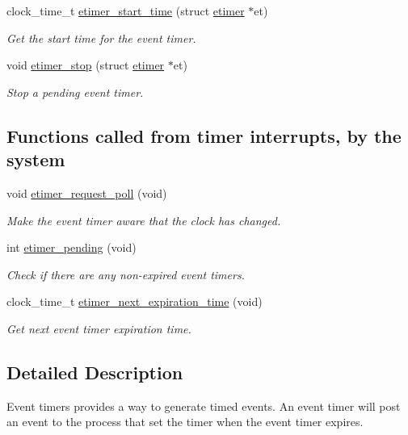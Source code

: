 \begin{DoxyCompactItemize}
clock\-\_\-time\-\_\-t \hyperlink{group__etimer_ga1c6f865134a64ecc5011ff5d3bd3b7fe}{etimer\-\_\-start\-\_\-time} (struct \hyperlink{structetimer}{etimer} $\ast$et)
\begin{DoxyCompactList}\small\item\em Get the start time for the event timer. \end{DoxyCompactList}\item 
void \hyperlink{group__etimer_ga94628979920ab92a3cc0e69e537bef7d}{etimer\-\_\-stop} (struct \hyperlink{structetimer}{etimer} $\ast$et)
\begin{DoxyCompactList}\small\item\em Stop a pending event timer. \end{DoxyCompactList}\end{DoxyCompactItemize}
\subsection*{Functions called from timer interrupts, by the system}
\begin{DoxyCompactItemize}
\item 
void \hyperlink{group__etimer_ga59f4cb712f2bba21ef307bcf67c83118}{etimer\-\_\-request\-\_\-poll} (void)
\begin{DoxyCompactList}\small\item\em Make the event timer aware that the clock has changed. \end{DoxyCompactList}\item 
int \hyperlink{group__etimer_ga1cc1db9f408e7c26035399ceb9ee1c5b}{etimer\-\_\-pending} (void)
\begin{DoxyCompactList}\small\item\em Check if there are any non-\/expired event timers. \end{DoxyCompactList}\item 
clock\-\_\-time\-\_\-t \hyperlink{group__etimer_ga904ba7c454cdf40eceaa010ed861006c}{etimer\-\_\-next\-\_\-expiration\-\_\-time} (void)
\begin{DoxyCompactList}\small\item\em Get next event timer expiration time. \end{DoxyCompactList}\end{DoxyCompactItemize}


\subsection{Detailed Description}
Event timers provides a way to generate timed events. An event timer will post an event to the process that set the timer when the event timer expires.

